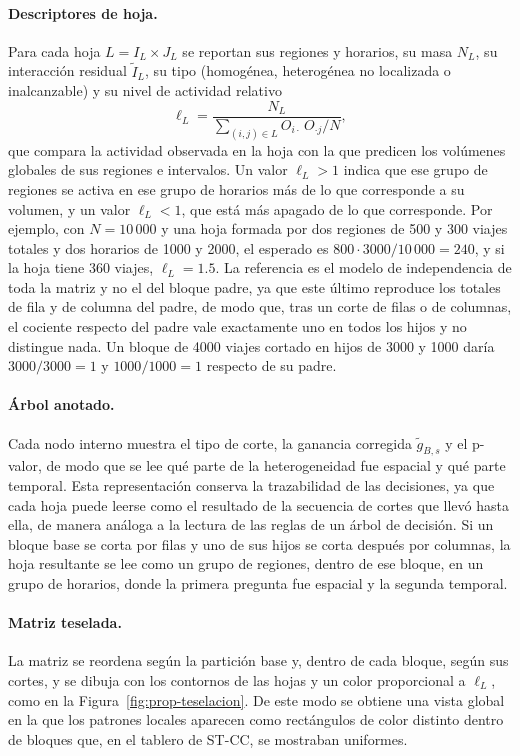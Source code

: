 \paragraph{Descriptores de hoja.} Para cada hoja $L = I_L\times J_L$ se reportan
sus regiones y horarios, su masa $N_L$, su interacción residual $\tilde I_L$, su
tipo (homogénea, heterogénea no localizada o inalcanzable) y su nivel de
actividad relativo
\begin{equation}\label{eq:prop-lift}
  \ell_L = \frac{N_L}{\sum_{(i,j)\in L} O_{i\cdot}\,O_{\cdot j}/N},
\end{equation}
que compara la actividad observada en la hoja con la que predicen los volúmenes
globales de sus regiones e intervalos. Un valor $\ell_L>1$ indica que ese grupo
de regiones se activa en ese grupo de horarios más de lo que corresponde a su
volumen, y un valor $\ell_L<1$, que está más apagado de lo que corresponde. Por
ejemplo, con $N=10\,000$ y una hoja formada por dos regiones de 500 y 300 viajes
totales y dos horarios de 1000 y 2000, el esperado es
$800\cdot3000/10\,000=240$, y si la hoja tiene 360 viajes, $\ell_L=1.5$. La referencia es el modelo de independencia de toda la matriz y no el
del bloque padre, ya que este último reproduce los totales de fila y de columna del
padre, de modo que, tras un corte de filas o de columnas, el cociente respecto
del padre vale exactamente uno en todos los hijos y no distingue nada. Un bloque
de 4000 viajes cortado en hijos de 3000 y 1000 daría $3000/3000=1$ y
$1000/1000=1$ respecto de su padre.

\paragraph{Árbol anotado.} Cada nodo interno muestra el tipo de corte, la
ganancia corregida $\tilde g_{B,s}$ y el p-valor, de modo que se lee qué parte de la
heterogeneidad fue espacial y qué parte temporal. Esta representación conserva la
trazabilidad de las decisiones, ya que cada hoja puede leerse como el resultado de
la secuencia de cortes que llevó hasta ella, de manera análoga a la lectura de las
reglas de un árbol de decisión. Si un bloque base se corta por filas y uno de
sus hijos se corta después por columnas, la hoja resultante se lee como un grupo
de regiones, dentro de ese bloque, en un grupo de horarios, donde la primera
pregunta fue espacial y la segunda temporal.

\paragraph{Matriz teselada.} La matriz se reordena según la partición base y,
dentro de cada bloque, según sus cortes, y se dibuja con los contornos de las
hojas y un color proporcional a $\ell_L$, como en la
Figura~\ref{fig:prop-teselacion}. De este modo se obtiene una vista global en la
que los patrones locales aparecen como rectángulos de color distinto dentro de
bloques que, en el tablero de ST-CC, se mostraban uniformes.

